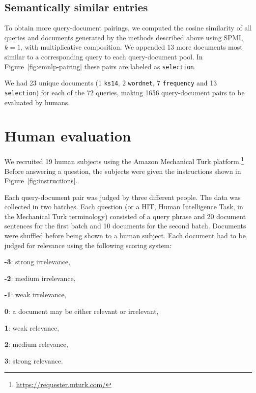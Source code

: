 \subsection{Semantically similar entries}

To obtain more query-document pairings, we computed the cosine similarity of all queries and documents generated by the methods described above using SPMI, $k=1$, with multiplicative composition. We appended 13 more documents most similar to a corresponding query to each query-document pool. In Figure~\ref{fig:emnlp-pairing} these pairs are labeled as \texttt{selection}.

We had 23 unique documents (1 \texttt{ks14}, 2 \texttt{wordnet}, 7
\texttt{frequency} and 13 \texttt{selection}) for each of the 72 queries, making
1656 query-document pairs to be evaluated by humans.

\section{Human evaluation}
\label{sec:human-evaluation}



We recruited 19 human subjects using the Amazon Mechanical Turk platform.\footnote{\url{https://requester.mturk.com/}} Before answering a question, the subjects were given the instructions shown in Figure~\ref{fig:instructions}.

Each query-document pair was judged by three different people. The data was collected in two batches. Each question (or a HIT, Human Intelligence Task, in the Mechanical Turk terminology) consisted of a query phrase and 20 document sentences for the first batch and 10 documents for the second batch. Documents were shuffled before being shown to a human subject. Each document had to be judged for relevance using the following scoring system:
\begin{compactitem}
\item \textbf{-3}: strong irrelevance,
\item \textbf{-2}: medium irrelevance,
\item \textbf{-1}: weak irrelevance,
\item  \textbf{0}: a document may be either relevant or irrelevant,
\item  \textbf{1}: weak relevance,
\item  \textbf{2}: medium relevance,
\item  \textbf{3}: strong relevance.
\end{compactitem}

